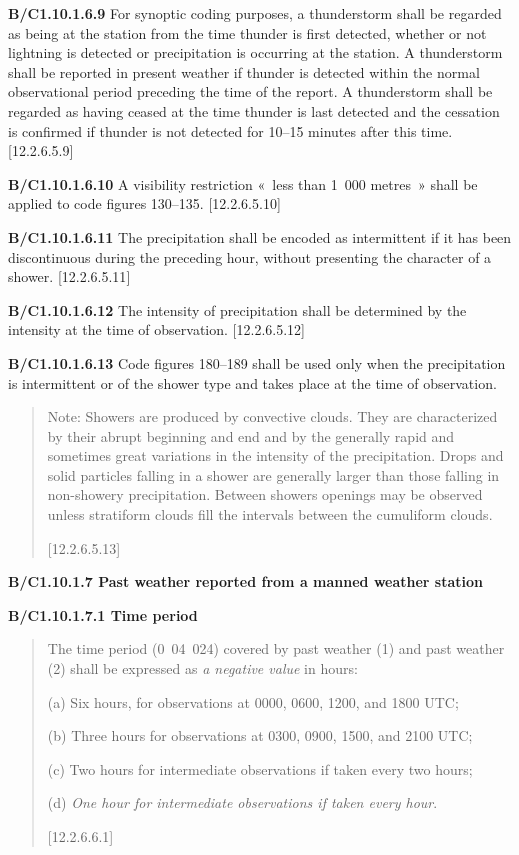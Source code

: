 \textbf{B/C1.10.1.6.9} For synoptic coding purposes, a thunderstorm shall be regarded as being at the station from the time thunder is first detected, whether or not lightning is detected or precipitation is occurring at the station. A thunderstorm shall be reported in present weather if thunder is detected within the normal observational period preceding the time of the report. A thunderstorm shall be regarded as having ceased at the time thunder is last detected and the cessation is confirmed if thunder is not detected for 10--15 minutes after this time. {[}12.2.6.5.9{]}

\textbf{B/C1.10.1.6.10} A visibility restriction «~less than 1~000 metres~» shall be applied to code figures 130--135. {[}12.2.6.5.10{]}

\textbf{B/C1.10.1.6.11} The precipitation shall be encoded as intermittent if it has been discontinuous during the preceding hour, without presenting the character of a shower. {[}12.2.6.5.11{]}

\textbf{B/C1.10.1.6.12} The intensity of precipitation shall be determined by the intensity at the time of observation. {[}12.2.6.5.12{]}

\textbf{B/C1.10.1.6.13} Code figures 180--189 shall be used only when the precipitation is intermittent or of the shower type and takes place at the time of observation.

\begin{quote}
Note: Showers are produced by convective clouds. They are characterized by their abrupt beginning and end and by the generally rapid and sometimes great variations in the intensity of the precipitation. Drops and solid particles falling in a shower are generally larger than those falling in non-showery precipitation. Between showers openings may be observed unless stratiform clouds fill the intervals between the cumuliform clouds.

{[}12.2.6.5.13{]}
\end{quote}

\textbf{B/C1.10.1.7 Past weather reported from a manned weather station}

\textbf{B/C1.10.1.7.1 Time period}

\begin{quote}
The time period (0~04~024) covered by past weather (1) and past weather (2) shall be expressed as \emph{a negative value} in hours:

(a) Six hours, for observations at 0000, 0600, 1200, and 1800 UTC;

(b) Three hours for observations at 0300, 0900, 1500, and 2100 UTC;

(c) Two hours for intermediate observations if taken every two hours;

(d) \emph{One hour for intermediate observations if taken every hour}.

{[}12.2.6.6.1{]}
\end{quote}

